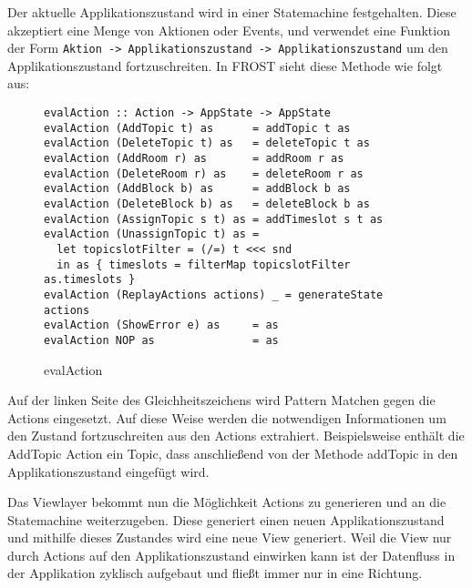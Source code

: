 Der aktuelle Applikationszustand wird in einer Statemachine festgehalten. Diese
akzeptiert eine Menge von Aktionen oder Events, und verwendet eine Funktion der
Form \texttt{Aktion -> Applikationszustand -> Applikationszustand} um den
Applikationszustand fortzuschreiten. In FROST sieht diese Methode wie folgt aus:
\begin{figure}
\begin{lstlisting}
evalAction :: Action -> AppState -> AppState
evalAction (AddTopic t) as      = addTopic t as
evalAction (DeleteTopic t) as   = deleteTopic t as
evalAction (AddRoom r) as       = addRoom r as
evalAction (DeleteRoom r) as    = deleteRoom r as
evalAction (AddBlock b) as      = addBlock b as
evalAction (DeleteBlock b) as   = deleteBlock b as
evalAction (AssignTopic s t) as = addTimeslot s t as
evalAction (UnassignTopic t) as =
  let topicslotFilter = (/=) t <<< snd
  in as { timeslots = filterMap topicslotFilter as.timeslots }
evalAction (ReplayActions actions) _ = generateState actions
evalAction (ShowError e) as     = as
evalAction NOP as               = as
\end{lstlisting}
\caption{evalAction}
\end{figure}

Auf der linken Seite des Gleichheitszeichens wird Pattern Matchen gegen die
Actions eingesetzt. Auf diese Weise werden die notwendigen Informationen um den
Zustand fortzuschreiten aus den Actions extrahiert. Beispielsweise enthält die
AddTopic Action ein Topic, dass anschließend von der Methode addTopic in den
Applikationszustand eingefügt wird.

Das Viewlayer bekommt nun die Möglichkeit Actions zu generieren und an die
Statemachine weiterzugeben. Diese generiert einen neuen Applikationszustand und
mithilfe dieses Zustandes wird eine neue View generiert. Weil die View nur durch
Actions auf den Applikationszustand einwirken kann ist der Datenfluss in der
Applikation zyklisch aufgebaut und fließt immer nur in eine Richtung.

